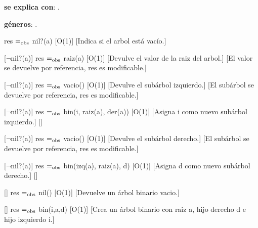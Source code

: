 \begin{Interfaz}
  
  
  \textbf{se explica con}: .
  
  \textbf{g\'eneros}: .


  {res $=_{\mathrm{obs}}$ nil?(a)}
  [O(1)]
  [Indica si el arbol est\'a vac\'io.]

  [$\neg$nil?(a)]
  {res $=_{\mathrm{obs}}$ raiz(a)}
  [O(1)]
  [Devulve el valor de la raiz del arbol.]
  [El valor se devuelve por referencia, res es modificable.]
  
  [$\neg$nil?(a)]  
  {res $=_{\mathrm{obs}}$ vacio()}
  [O(1)]
  [Devulve el subárbol izquierdo.]
  [El subárbol se devuelve por referencia, res es modificable.]
  
  [$\neg$nil?(a)]  
  {res $=_{\mathrm{obs}}$ bin(i, raiz(a), der(a))}
  [O(1)]
  [Asigna i como nuevo subárbol izquierdo.]
  []
  
  [$\neg$nil?(a)]  
  {res $=_{\mathrm{obs}}$ vacio()}
  [O(1)]
  [Devulve el subárbol derecho.]
  [El subárbol se devuelve por referencia, res es modificable.]
  
  [$\neg$nil?(a)]  
  {res $=_{\mathrm{obs}}$ bin(izq(a), raiz(a), d)}
  [O(1)]
  [Asigna d como nuevo subárbol derecho.]
  []
  
  []
  {res $=_{\mathrm{obs}}$ nil()}
  [O(1)]
  [Devuelve un \'arbol binario vacio.]
  
  []
  {res $=_{\mathrm{obs}}$ bin(i,a,d)}
  [O(1)]
  [Crea un \'arbol binario con raiz a, hijo derecho d e hijo izquierdo i.]

\end{Interfaz}

\newpage 

